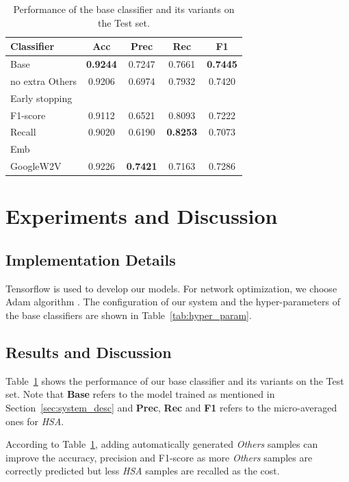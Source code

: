 \documentclass[11pt,a4paper]{article}
\begin{document}
\begin{table}\small
\begin{center}
\begin{tabular}{l|cccc}
\hline
\bf Classifier & \bf Acc & \bf Prec & \bf Rec & \bf F1 \\ 
\hline
Base  & \bf 0.9244 & 0.7247 & 0.7661 & \bf 0.7445 \\
\quad no extra Others & 0.9206 & 0.6974 & 0.7932 & 0.7420 \\
\hline
Early stopping & & & & \\
\quad F1-score & 0.9112 & 0.6521 & 0.8093 & 0.7222 \\
\quad Recall & 0.9020 & 0.6190 & \bf 0.8253 & 0.7073 \\
\hline
Emb \\
\quad GoogleW2V & 0.9226 & \bf 0.7421 & 0.7163 & 0.7286 \\
\hline
\end{tabular}
\end{center}
\caption{\label{tab:base_clfr} Performance of the base classifier and its variants on the Test set.}
\end{table}

\section{Experiments and Discussion}
\label{sec:experiments}

\subsection{Implementation Details}

Tensorflow \cite{tensorflow} is used to develop our models. For network optimization, we choose Adam algorithm \cite{Kingma2014Adam}. The configuration of our system and the hyper-parameters of the base classifiers are shown in Table~\ref{tab:hyper_param}. 

\subsection{Results and Discussion}

Table~\ref{tab:base_clfr} shows the performance of our base classifier and its variants on the Test set. Note that {\bf Base} refers to the model trained as mentioned in Section~\ref{sec:system_desc} and {\bf Prec}, {\bf Rec} and {\bf F1} refers to the micro-averaged ones for {\em HSA}.

According to Table~\ref{tab:base_clfr}, adding automatically generated {\em Others} samples can improve the accuracy, precision and F1-score as more {\em Others} samples are correctly predicted but less {\em HSA} samples are recalled as the cost.
\end{document}
